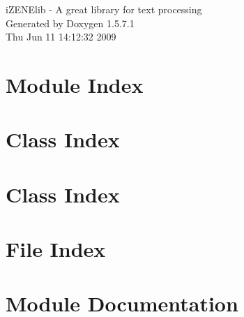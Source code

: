 \documentclass[a4paper]{book}
\begin{document}
\begin{titlepage}
\vspace*{7cm}
\begin{center}
{\Large iZENElib - A great library for text processing }\\
\vspace*{1cm}
{\large Generated by Doxygen 1.5.7.1}\\
\vspace*{0.5cm}
{\small Thu Jun 11 14:12:32 2009}\\
\end{center}
\end{titlepage}
\clearemptydoublepage
{}
\tableofcontents
\clearemptydoublepage
{}
\chapter{Module Index}

\chapter{Class Index}

\chapter{Class Index}

\chapter{File Index}

\chapter{Module Documentation}


\end{document}
